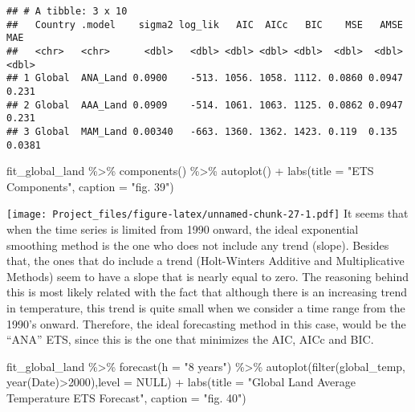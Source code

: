 \documentclass[
]{article}
\newenvironment{Shaded}{\begin{snugshade}}{\end{snugshade}}
\newcommand{\AttributeTok}[1]{\textcolor[rgb]{0.77,0.63,0.00}{#1}}
\newcommand{\ConstantTok}[1]{\textcolor[rgb]{0.00,0.00,0.00}{#1}}
\newcommand{\DecValTok}[1]{\textcolor[rgb]{0.00,0.00,0.81}{#1}}
\newcommand{\FunctionTok}[1]{\textcolor[rgb]{0.00,0.00,0.00}{#1}}
\newcommand{\NormalTok}[1]{#1}
\newcommand{\SpecialCharTok}[1]{\textcolor[rgb]{0.00,0.00,0.00}{#1}}
\newcommand{\StringTok}[1]{\textcolor[rgb]{0.31,0.60,0.02}{#1}}
\begin{document}
\begin{verbatim}
## # A tibble: 3 x 10
##   Country .model    sigma2 log_lik   AIC  AICc   BIC    MSE   AMSE    MAE
##   <chr>   <chr>      <dbl>   <dbl> <dbl> <dbl> <dbl>  <dbl>  <dbl>  <dbl>
## 1 Global  ANA_Land 0.0900    -513. 1056. 1058. 1112. 0.0860 0.0947 0.231 
## 2 Global  AAA_Land 0.0909    -514. 1061. 1063. 1125. 0.0862 0.0947 0.231 
## 3 Global  MAM_Land 0.00340   -663. 1360. 1362. 1423. 0.119  0.135  0.0381
\end{verbatim}

\begin{Shaded}
\begin{Highlighting}[]
\NormalTok{fit\_global\_land }\SpecialCharTok{\%\textgreater{}\%} 
  \FunctionTok{components}\NormalTok{() }\SpecialCharTok{\%\textgreater{}\%} 
  \FunctionTok{autoplot}\NormalTok{() }\SpecialCharTok{+} \FunctionTok{labs}\NormalTok{(}\AttributeTok{title =} \StringTok{"ETS Components"}\NormalTok{, }\AttributeTok{caption =} \StringTok{"fig. 39"}\NormalTok{)}
\end{Highlighting}
\end{Shaded}

\texttt{[image: Project\_files/figure-latex/unnamed-chunk-27-1.pdf]} It
seems that when the time series is limited from 1990 onward, the ideal
exponential smoothing method is the one who does not include any trend
(slope). Besides that, the ones that do include a trend (Holt-Winters
Additive and Multiplicative Methods) seem to have a slope that is nearly
equal to zero. The reasoning behind this is most likely related with the
fact that although there is an increasing trend in temperature, this
trend is quite small when we consider a time range from the 1990's
onward. Therefore, the ideal forecasting method in this case, would be
the ``ANA'' ETS, since this is the one that minimizes the AIC, AICc and
BIC.

\begin{Shaded}
\begin{Highlighting}[]
\NormalTok{fit\_global\_land }\SpecialCharTok{\%\textgreater{}\%} 
  \FunctionTok{forecast}\NormalTok{(}\AttributeTok{h =} \StringTok{"8 years"}\NormalTok{) }\SpecialCharTok{\%\textgreater{}\%} 
  \FunctionTok{autoplot}\NormalTok{(}\FunctionTok{filter}\NormalTok{(global\_temp, }\FunctionTok{year}\NormalTok{(Date)}\SpecialCharTok{\textgreater{}}\DecValTok{2000}\NormalTok{),}\AttributeTok{level =} \ConstantTok{NULL}\NormalTok{) }\SpecialCharTok{+} \FunctionTok{labs}\NormalTok{(}\AttributeTok{title =} \StringTok{"Global Land Average Temperature ETS Forecast"}\NormalTok{, }\AttributeTok{caption =} \StringTok{"fig. 40"}\NormalTok{)}
\end{Highlighting}
\end{Shaded}
\end{document}
